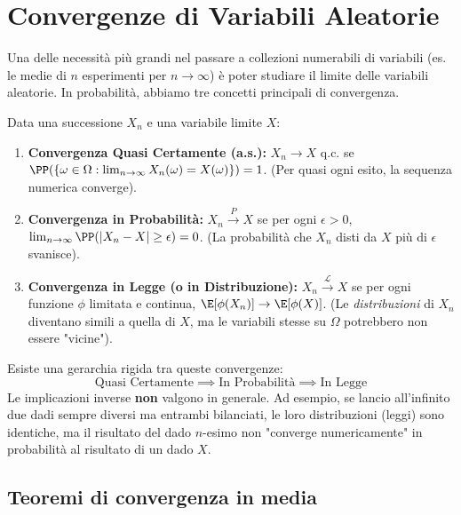 \section{Convergenze di Variabili Aleatorie}

Una delle necessità più grandi nel passare a collezioni numerabili di variabili (es. le medie di $n$ esperimenti per $n \to \infty$) è poter studiare il limite delle variabili aleatorie.
In probabilità, abbiamo tre concetti principali di convergenza.

\begin{definition}
Data una successione $X_n$ e una variabile limite $X$:
\begin{enumerate}
    \item \textbf{Convergenza Quasi Certamente (a.s.):} $X_n \to X$ q.c. se $\PP(\{\omega \in \Omega : \lim_{n\to\infty} X_n(\omega) = X(\omega)\}) = 1$. (Per quasi ogni esito, la sequenza numerica converge).
    \item \textbf{Convergenza in Probabilità:} $X_n \stackrel{P}{\to} X$ se per ogni $\epsilon > 0$, $\lim_{n\to\infty} \PP(|X_n - X| \ge \epsilon) = 0$. (La probabilità che $X_n$ disti da $X$ più di $\epsilon$ svanisce).
    \item \textbf{Convergenza in Legge (o in Distribuzione):} $X_n \stackrel{\mathcal{L}}{\to} X$ se per ogni funzione $\phi$ limitata e continua, $\E[\phi(X_n)] \to \E[\phi(X)]$. (Le \emph{distribuzioni} di $X_n$ diventano simili a quella di $X$, ma le variabili stesse su $\Omega$ potrebbero non essere "vicine").
\end{enumerate}
\end{definition}

\begin{spiegazione}
    Esiste una gerarchia rigida tra queste convergenze:
    \[ \text{Quasi Certamente} \implies \text{In Probabilità} \implies \text{In Legge} \]
    Le implicazioni inverse \textbf{non} valgono in generale. 
    Ad esempio, se lancio all'infinito due dadi sempre diversi ma entrambi bilanciati, le loro distribuzioni (leggi) sono identiche, ma il risultato del dado $n$-esimo non "converge numericamente" in probabilità al risultato di un dado $X$.
\end{spiegazione}

\subsection{Teoremi di convergenza in media}

